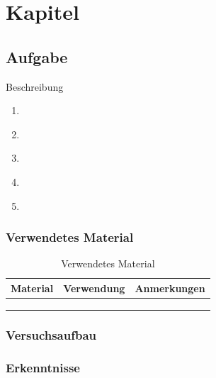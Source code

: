 \newpage
\section{Kapitel}\label{sec:1}

\subsection{Aufgabe}\label{sec:1-1}

\begin{highlightblock}[Aufgabe]
Beschreibung
\begin{enumerate}[label=\textbf{\alph*:}, ref=\alph*, noitemsep]
    \item\label{itm:1-P1-1} 
    \item\label{itm:1-P1-2} 
    \item\label{itm:1-P1-3} 
    \item\label{itm:1-P1-4} 
    \item\label{itm:1-P1-5} 
\end{enumerate}
\end{highlightblock}

\subsubsection{Verwendetes Material}

\begin{table}[h]
	\centering
	\caption{Verwendetes Material}
	\begin{tabularx}{\textwidth}{XXX}
		\textbf{Material} & \textbf{Verwendung} & \textbf{Anmerkungen}\\ \midrule
		& & \\
		& & \\
		& & \\
	\end{tabularx}	
\end{table}

\subsubsection{Versuchsaufbau}

\marginref{\ref{itm:1-P1-1}}
\marginref{\ref{itm:1-P1-2}}
\marginref{\ref{itm:1-P1-3}}
\marginref{\ref{itm:1-P1-4}}
\marginref{\ref{itm:1-P1-5}}

\subsubsection{Erkenntnisse}

